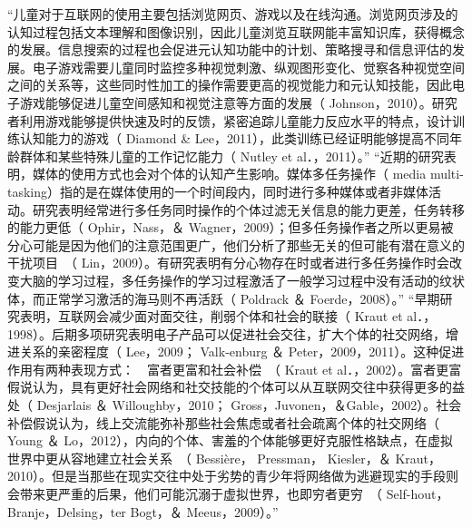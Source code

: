 “儿童对于互联网的使用主要包括浏览网页、游戏以及在线沟通。浏览网页涉及的认知过程包括文本理解和图像识别，因此儿童浏览互联网能丰富知识库，获得概念的发展。信息搜索的过程也会促进元认知功能中的计划、策略搜寻和信息评估的发展。电子游戏需要儿童同时监控多种视觉刺激、纵观图形变化、觉察各种视觉空间之间的关系等，这些同时性加工的操作需要更高的视觉能力和元认知技能，因此电子游戏能够促进儿童空间感知和视觉注意等方面的发展（ Johnson，2010）。研究者利用游戏能够提供快速及时的反馈，紧密追踪儿童能力反应水平的特点，设计训练认知能力的游戏（ Diamond \& Lee，2011），此类训练已经证明能够提高不同年龄群体和某些特殊儿童的工作记忆能力（ Nutley et al．，2011）。”
“近期的研究表明，媒体的使用方式也会对个体的认知产生影响。媒体多任务操作（ media multi-tasking）指的是在媒体使用的一个时间段内，同时进行多种媒体或者非媒体活动。研究表明经常进行多任务同时操作的个体过滤无关信息的能力更差，任务转移的能力更低（ Ophir，Nass，＆ Wagner，2009）；但多任务操作者之所以更易被分心可能是因为他们的注意范围更广，他们分析了那些无关的但可能有潜在意义的干扰项目　（ Lin，2009）。有研究表明有分心物存在时或者进行多任务操作时会改变大脑的学习过程，多任务操作的学习过程激活了一般学习过程中没有活动的纹状体，而正常学习激活的海马则不再活跃（ Poldrack ＆ Foerde，2008）。”
“早期研究表明，互联网会减少面对面交往，削弱个体和社会的联接（ Kraut et al．，1998）。后期多项研究表明电子产品可以促进社会交往，扩大个体的社交网络，增进关系的亲密程度（ Lee，2009； Valk-enburg ＆ Peter，2009，2011）。这种促进作用有两种表现方式：　富者更富和社会补偿　（ Kraut et al．，2002）。富者更富假说认为，具有更好社会网络和社交技能的个体可以从互联网交往中获得更多的益处（ Desjarlais ＆ Willoughby，2010； Gross，Juvonen，＆Gable，2002）。社会补偿假说认为，线上交流能弥补那些社会焦虑或者社会疏离个体的社交网络（ Young ＆ Lo，2012），内向的个体、害羞的个体能够更好克服性格缺点，在虚拟世界中更从容地建立社会关系　（ Bessière， Pressman， Kiesler，＆ Kraut，2010）。但是当那些在现实交往中处于劣势的青少年将网络做为逃避现实的手段则会带来更严重的后果，他们可能沉溺于虚拟世界，也即穷者更穷　（ Self-hout，Branje，Delsing，ter Bogt，＆ Meeus，2009）。”\cite{杨晓辉2014电子媒体的使用与儿童发展}

